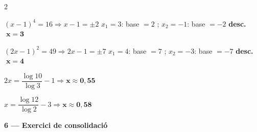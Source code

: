 \documentclass[12pt,a4paper]{article}
\begin{document}
\begin{multicols}{2}
\begin{exercicis}
    \item $(x-1)^4=16\Rightarrow x-1=\pm2$ \newline $x_1=3$: base $=2$ \checkmark; $x_2=-1$: base $=-2$ \textbf{desc.} $\;\boldsymbol{x=3}$
    \item $(2x-1)^2=49\Rightarrow 2x-1=\pm7$ \newline $x_1=4$: base $=7$ \checkmark; $x_2=-3$: base $=-7$ \textbf{desc.} $\;\boldsymbol{x=4}$
    \item $2x=\dfrac{\log10}{\log3}-1 \Rightarrow \boldsymbol{x\approx0{,}55}$
    \item $x=\dfrac{\log12}{\log2}-3 \Rightarrow \boldsymbol{x\approx0{,}58}$
\end{exercicis}
\end{multicols}

\vspace{0.3cm}

\noindent\textbf{6 --- Exercici de consolidació}
\end{document}
